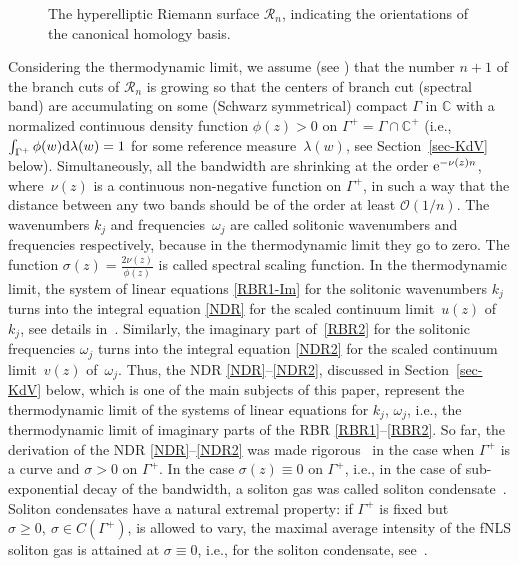\documentclass[pdftex]{sigma}
\numberwithin{equation}{section}
\newcommand{\G}{\Gamma}
\renewcommand{\o}{\omega}
\def\Rscr{\mathcal{R}}
\def\C{{\mathbb C}}
\def\l{\lambda}
\def\s{ {\sigma}}
\def\l{\lambda}
\def\s{\sigma}
\def\o{\omega}
\def\G{\Gamma}
\begin{document}
\begin{figure}[h]
{}

	\caption{The hyperelliptic Riemann surface $\mathcal R_n$, indicating the orientations of the canonical homology basis.  }
	\label{Fig:Cont}
	\vspace{5pt}
\end{figure}


Considering the thermodynamic limit, we assume
(see \cite{ElRew1,ET2020}) that the number $n+1$ of the branch cuts of $\Rscr_n$ is growing so that the centers of branch cut (spectral band) are accumulating on some (Schwarz symmetrical) compact $\G$ in $\C$ with a
normalized continuous density function $\phi(z)>0$ on $\G^+=\G\cap\C^+$ \big(i.e., $\int_{\G^+}\phi(w){\rm d}\l(w)=1$ for some reference measure~$\l(w)$, see Section~\ref{sec-KdV} below\big).
Simultaneously, all the bandwidth are shrinking at the order ${\rm e}^{-\nu(z)n}$, where~$\nu(z)$ is a continuous non-negative function on $\G^+$,
in such a way that the distance between any two bands should be of the order at least $\mathcal{O}(1/n)$. The wavenumbers $k_j$ and frequencies~$\o_j$ are called solitonic wavenumbers and frequencies respectively, because in the thermodynamic limit they go to zero. The function $\s(z)=\frac{ 2\nu(z)}{\phi(z)}$ is called spectral scaling function.
	In
	the thermodynamic limit, the system of linear equations \eqref{RBR1-Im} for the solitonic wavenumbers $k_j$ turns into the integral equation \eqref{NDR} for the scaled continuum limit~$u(z)$ of~$k_j$, see details in~\cite{ET2020}.
	Similarly, the imaginary part of~\eqref{RBR2} for the solitonic frequencies $\o_j$ turns into the integral equation \eqref{NDR2} for the scaled continuum limit~$v(z)$ of~$\o_j$.
	Thus, the NDR
	\eqref{NDR}--\eqref{NDR2}, discussed in Section~\ref{sec-KdV} below, which is one of the main subjects of this paper, represent the thermodynamic limit of the systems of linear equations for $k_j$, $\o_j$, i.e., the thermodynamic limit of imaginary parts of the RBR \eqref{RBR1}--\eqref{RBR2}.
So far, the derivation of the NDR
\eqref{NDR}--\eqref{NDR2} was made rigorous~\cite{TW}
in the case when $\G^+$ is a curve and $\s>0$ on $\G^+$. In the case $\s(z)\equiv 0$ on $\G^+$, i.e., in the case of sub-exponential decay of the bandwidth, a soliton gas was called soliton condensate~\cite{ET2020}. Soliton condensates have a natural extremal property: if $\G^+$ is fixed but $\s\geq 0,~\s\in C(\G^+)$, is allowed to vary, the maximal average intensity of the fNLS soliton gas is attained at $\s\equiv 0$, i.e., for the soliton condensate, see~\cite{KT2021}.
\end{document}
